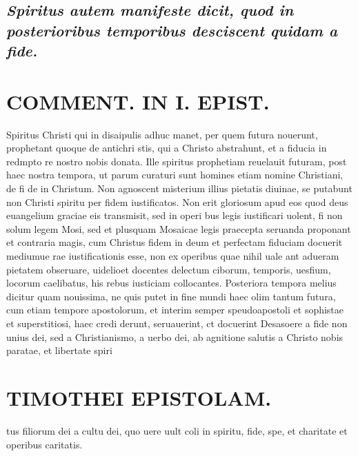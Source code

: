 \documentclass{article}
\begin{document}
\begin{pages}
\subsection*{\textit{\huge\textbf{S}\normalsize piritus autem manifeste dicit, quod in posterioribus temporibus desciscent quidam a fide. }}
\section*{COMMENT. IN I. EPIST. }
\marginpar{[ p.94 ]}\pstart Spiritus Christi qui in disaipulis adhuc manet, per quem futura nouerunt, prophetant quoque de antichri stis, qui a Christo abstrahunt, et a fiducia in redmpto re nostro nobis donata. Ille spiritus prophetiam reuelauit futuram, post haec nostra tempora, ut parum curaturi sunt homines etiam nomine Christiani, de fi de in Christum. Non agnoscent misterium illius pietatis diuinae, se putabunt non Christi spiritu per fidem iustificatos. Non erit gloriosum apud eos quod deus euangelium graciae eis transmisit, sed in operi bus legis iustificari uolent, fi non solum legem Mosi, sed et plusquam Mosaicae legis praecepta seruanda proponant et contraria magis, cum Christus fidem in deum et perfectam fiduciam docuerit mediumue rae iustificationis esse, non ex operibus quae nihil uale ant adueram pietatem obseruare, uidelioet docentes delectum ciborum, temporis, uesfium, locorum caelibatus, his rebus iusticiam collocantes. Posteriora tempora melius dicitur quam nouissima, ne quis putet in fine mundi haec olim tantum futura, cum etiam tempore apostolorum, et interim semper speudoapostoli et sophistae et superstitiosi, haec credi derunt, seruauerint, ct docuerint Desasoere a fide non unius dei, sed a Christianismo, a uerbo dei, ab agnitione salutis a Christo nobis paratae, et libertate spiri\pend
\section*{TIMOTHEI EPISTOLAM. }
\marginpar{[ p.95 ]}\pstart tus filiorum dei a cultu dei, quo uere uult coli in spiritu, fide, spe, et charitate et operibus caritatis.  \pend
{}
{}

\end{pages}
\end{document}
